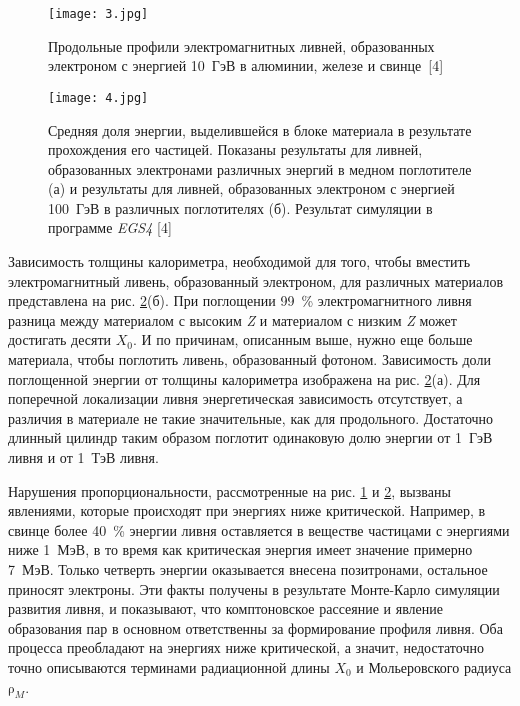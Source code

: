 \begin{figure}[H]
    \centering
    \texttt{[image: 3.jpg]}
    \caption{Продольные профили электромагнитных ливней, образованных электроном с энергией \mbox{10 ГэВ} в алюминии, железе и \mbox{свинце [4]}}
    \label{fig:elEnDepMat}
\end{figure}

\begin{figure}[H]
    \centering
    \texttt{[image: 4.jpg]}
    \caption{Средняя доля энергии, выделившейся в блоке материала в результате прохождения его частицей. Показаны результаты для ливней, образованных электронами различных энергий в медном поглотителе (а) и результаты для ливней, образованных электроном с энергией \mbox{100 ГэВ} в различных поглотителях (б). Результат симуляции в программе \textit{EGS4} [4]}
    \label{fig:fracEnAndMat}
\end{figure}

Зависимость  толщины  калориметра,  необходимой  для  того,  чтобы вместить   электромагнитный   ливень,   образованный   электроном,   для различных материалов представлена на рис. \ref{fig:fracEnAndMat}(б). При поглощении \mbox{99 \%} электромагнитного  ливня разница  между  материалом  с  высоким {\textit Z} и материалом  с  низким {\textit Z} может  достигать  десяти $X_0$. И  по  причинам, описанным  выше,  нужно  еще  больше  материала,  чтобы  поглотить  ливень, образованный фотоном. Зависимость доли поглощенной энергии от толщины калориметра изображена на рис. \ref{fig:fracEnAndMat}(а). Для поперечной локализации ливня энергетическая  зависимость  отсутствует,  а различия  в  материале  не  такие значительные,  как  для  продольного. Достаточно  длинный  цилиндр таким образом  поглотит  одинаковую  долю  энергии  от \mbox{1  ГэВ}  ливня  и  от \mbox{1  ТэВ} ливня.

Нарушения пропорциональности, рассмотренные на рис. \ref{fig:elEnDepMat} и \ref{fig:fracEnAndMat}, вызваны явлениями, которые происходят при энергиях ниже критической. Например, в  свинце  более  \mbox{40 \%}  энергии  ливня оставляется  в  веществе частицами  с энергиями ниже \mbox{1 МэВ}, в то время как критическая энергия имеет значение примерно \mbox{7 МэВ}. Только четверть энергии оказывается внесена позитронами, остальное  приносят  электроны.  Эти  факты получены  в  результате  Монте-Карло  симуляции  развития  ливня, и показывают,  что  комптоновское рассеяние  и  явление  образования  пар в  основном  ответственны  за формирование профиля ливня. Оба процесса преобладают на энергиях ниже критической,  а  значит,  недостаточно  точно  описываются  терминами радиационной длины $X_0$ и Мольеровского радиуса $\mathrm{\rho}_M$.